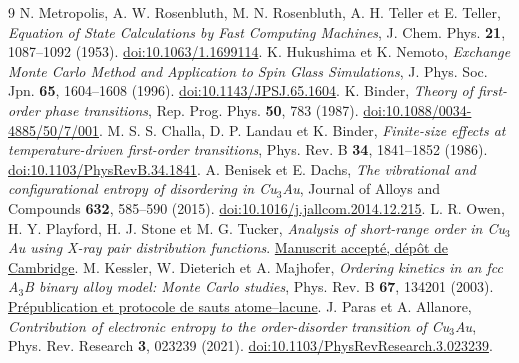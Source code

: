 \documentclass[10pt,a4paper]{article}
\begin{document}
\begin{thebibliography}{9}
 N. Metropolis, A. W. Rosenbluth, M. N. Rosenbluth,
A. H. Teller et E. Teller, \emph{Equation of State Calculations by Fast
Computing Machines}, J. Chem. Phys. \textbf{21}, 1087--1092 (1953).
\href{https://doi.org/10.1063/1.1699114}{doi:10.1063/1.1699114}.
 K. Hukushima et K. Nemoto, \emph{Exchange Monte Carlo
Method and Application to Spin Glass Simulations}, J. Phys. Soc. Jpn.
\textbf{65}, 1604--1608 (1996).
\href{https://doi.org/10.1143/JPSJ.65.1604}{doi:10.1143/JPSJ.65.1604}.
 K. Binder, \emph{Theory of first-order phase transitions},
Rep. Prog. Phys. \textbf{50}, 783 (1987).
\href{https://doi.org/10.1088/0034-4885/50/7/001}{doi:10.1088/0034-4885/50/7/001}.
 M. S. S. Challa, D. P. Landau et K. Binder,
\emph{Finite-size effects at temperature-driven first-order transitions},
Phys. Rev. B \textbf{34}, 1841--1852 (1986).
\href{https://doi.org/10.1103/PhysRevB.34.1841}{doi:10.1103/PhysRevB.34.1841}.
 A. Benisek et E. Dachs, \emph{The vibrational and configurational
entropy of disordering in Cu$_3$Au}, Journal of Alloys and Compounds
\textbf{632}, 585--590 (2015).
\href{https://doi.org/10.1016/j.jallcom.2014.12.215}{doi:10.1016/j.jallcom.2014.12.215}.
 L. R. Owen, H. Y. Playford, H. J. Stone et M. G. Tucker,
\emph{Analysis of short-range order in Cu$_3$Au using X-ray pair distribution functions}.
\href{https://doi.org/10.17863/CAM.38392}{Manuscrit accepté, dépôt de Cambridge}.
 M. Kessler, W. Dieterich et A. Majhofer,
\emph{Ordering kinetics in an fcc A$_3$B binary alloy model: Monte Carlo studies},
Phys. Rev. B \textbf{67}, 134201 (2003).
\href{https://arxiv.org/abs/cond-mat/0207611}{Prépublication et protocole de sauts atome--lacune}.
 J. Paras et A. Allanore, \emph{Contribution of electronic
entropy to the order-disorder transition of Cu$_3$Au}, Phys. Rev. Research
\textbf{3}, 023239 (2021).
\href{https://doi.org/10.1103/PhysRevResearch.3.023239}{doi:10.1103/PhysRevResearch.3.023239}.
\end{thebibliography}
\end{document}
